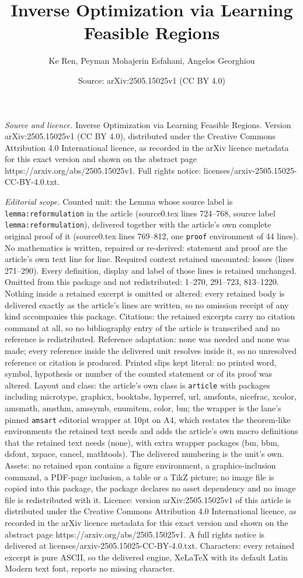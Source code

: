 \documentclass[10pt,a4paper]{amsart}
\title[Inverse Optimization via Learning Feasible Regions]{Inverse Optimization via Learning Feasible Regions}
\author{Ke Ren, Peyman Mohajerin Esfahani, Angelos Georghiou}
\date{Source: arXiv:2505.15025v1 (CC BY 4.0)}
\begin{document}
\maketitle

\noindent\emph{Source and licence.} Inverse Optimization via Learning Feasible Regions. Version arXiv:2505.15025v1 (CC BY 4.0), distributed under the Creative Commons Attribution 4.0 International licence, as recorded in the arXiv licence metadata for this exact version and shown on the abstract page https://arxiv.org/abs/2505.15025v1. Full rights notice: licenses/arxiv-2505.15025-CC-BY-4.0.txt.\par\smallskip

\noindent\textit{Editorial scope.} Counted unit: the Lemma whose source label is \texttt{lemma:reformulation} in the article (source0.tex lines 724--768, source label \texttt{lemma:reformulation}), delivered together with the article's own complete original proof of it (source0.tex lines 769--812, one \texttt{proof} environment of 44 lines). No mathematics is written, repaired or re-derived: statement and proof are the article's own text line for line. Required context retained uncounted: losses (lines 271--290). Every definition, display and label of those lines is retained unchanged. Omitted from this package and not redistributed: 1--270, 291--723, 813--1220. Nothing inside a retained excerpt is omitted or altered: every retained body is delivered exactly as the article's lines are written, so no omission receipt of any kind accompanies this package. Citations: the retained excerpts carry no citation command at all, so no bibliography entry of the article is transcribed and no reference is redistributed. Reference adaptation: none was needed and none was made; every reference inside the delivered unit resolves inside it, so no unresolved reference or citation is produced. Printed slips kept literal: no printed word, symbol, hypothesis or number of the counted statement or of its proof was altered. Layout and class: the article's own class is \texttt{article} with packages including microtype, graphicx, booktabs, hyperref, url, amsfonts, nicefrac, xcolor, amsmath, amsthm, amssymb, enumitem, color, bm; the wrapper is the lane's pinned \texttt{amsart} editorial wrapper at 10pt on A4, which restates the theorem-like environments the retained text needs and adds the article's own macro definitions that the retained text needs (none), with extra wrapper packages (bm, bbm, dsfont, xspace, cancel, mathtools). The delivered numbering is the unit's own. Assets: no retained span contains a figure environment, a graphics-inclusion command, a PDF-page inclusion, a table or a TikZ picture; no image file is copied into this package, the package declares no asset dependency and no image file is redistributed with it. Licence: version arXiv:2505.15025v1 of this article is distributed under the Creative Commons Attribution 4.0 International licence, as recorded in the arXiv licence metadata for this exact version and shown on the abstract page https://arxiv.org/abs/2505.15025v1. A full rights notice is delivered at licenses/arxiv-2505.15025-CC-BY-4.0.txt. Characters: every retained excerpt is pure ASCII, so the delivered engine, XeLaTeX with its default Latin Modern text font, reports no missing character.
\end{document}
